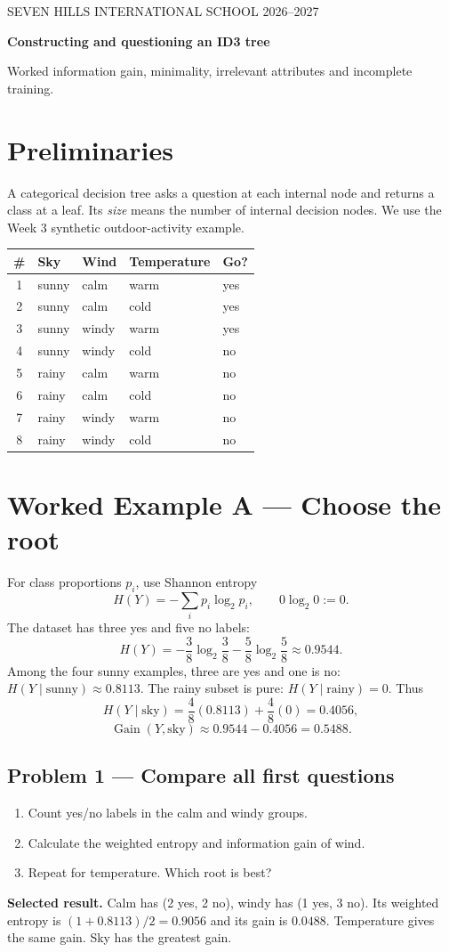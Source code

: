 \documentclass[11pt,a4paper]{article}
\newcommand{\problem}[1]{\subsection*{Problem #1}}
\begin{document}
{\small SEVEN HILLS INTERNATIONAL SCHOOL \hfill 2026--2027}

{\Large\bfseries Constructing and questioning an ID3 tree}\par
Worked information gain, minimality, irrelevant attributes and incomplete training.

\section*{Preliminaries}
A categorical decision tree asks a question at each internal node and returns a class at a leaf. Its \emph{size} means the number of internal decision nodes. We use the Week 3 synthetic outdoor-activity example.

\begin{center}
\begin{tabular}{cllll}
\toprule
\# & Sky & Wind & Temperature & Go?\\\midrule
1 & sunny & calm & warm & yes\\
2 & sunny & calm & cold & yes\\
3 & sunny & windy & warm & yes\\
4 & sunny & windy & cold & no\\
5 & rainy & calm & warm & no\\
6 & rainy & calm & cold & no\\
7 & rainy & windy & warm & no\\
8 & rainy & windy & cold & no\\\bottomrule
\end{tabular}
\end{center}

\section*{Worked Example A --- Choose the root}
For class proportions $p_i$, use Shannon entropy
\[
H(Y)=-\sum_i p_i\log_2 p_i,\qquad 0\log_2 0:=0.
\]
The dataset has three yes and five no labels:
\[
H(Y)=-\frac38\log_2\frac38-\frac58\log_2\frac58\approx0.9544.
\]
Among the four sunny examples, three are yes and one is no: $H(Y\mid\text{sunny})\approx0.8113$. The rainy subset is pure: $H(Y\mid\text{rainy})=0$. Thus
\[
H(Y\mid\text{sky})=\frac48(0.8113)+\frac48(0)=0.4056,
\]
\[
\operatorname{Gain}(Y,\text{sky})\approx0.9544-0.4056=\boxed{0.5488}.
\]

\problem{1 --- Compare all first questions}
\begin{enumerate}[label=(\alph*)]
\item Count yes/no labels in the calm and windy groups.
\item Calculate the weighted entropy and information gain of wind.
\item Repeat for temperature. Which root is best?
\end{enumerate}
\textbf{Selected result.} Calm has (2 yes, 2 no), windy has (1 yes, 3 no). Its weighted entropy is $(1+0.8113)/2=0.9056$ and its gain is $0.0488$. Temperature gives the same gain. Sky has the greatest gain.
\end{document}
